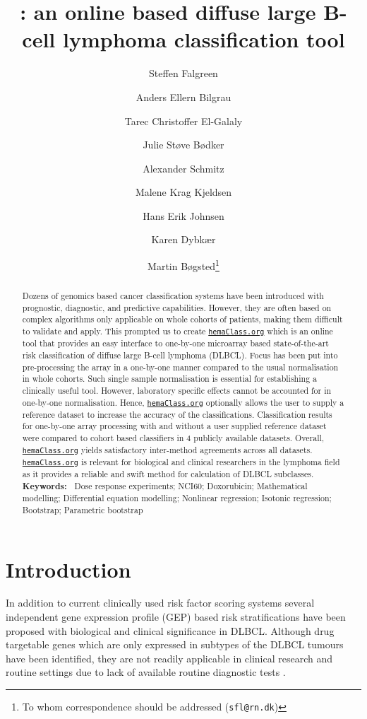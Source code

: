 \documentclass{article}
\title{\hemaClass{}: an online based diffuse large B-cell lymphoma classification tool}
\author[1]{Steffen Falgreen}
\author[12]{Anders Ellern Bilgrau}
\author[1]{Tarec Christoffer El-Galaly}
\author[1]{Julie St{\o}ve  B{\o}dker}
\author[1]{Alexander Schmitz}
\author[1]{Malene Krag Kjeldsen}
\author[1]{Hans Erik Johnsen}
\author[1]{Karen Dybk{\ae}r}
\author[13]{Martin B{\o}gsted\thanks{To whom correspondence should be addressed (\texttt{sfl@rn.dk})}}
\affil[1]{Department of Haematology, Aalborg University Hospital}
\affil[2]{Department of Mathematical Sciences, Aalborg University}
\affil[3]{Department of Clinical Medicine, Aalborg University}
\newcommand{\hemaClass}{\href{http://hemaClass.org}{\texttt{hemaClass.org}}}
\begin{document}
\maketitle
{}
{}
\begin{abstract}
Dozens of genomics based cancer classification systems have been introduced with prognostic, diagnostic, and predictive capabilities.
However, they are often based on complex algorithms only applicable on whole cohorts of patients, making them difficult to validate and apply.
This prompted us to create \hemaClass{} which is an online tool that provides an easy interface to one-by-one microarray based state-of-the-art risk classification of diffuse large B-cell lymphoma (DLBCL).
Focus has been put into pre-processing the array in a one-by-one manner compared to the usual normalisation in whole cohorts.
Such single sample normalisation is essential for establishing a clinically useful tool.
However, laboratory specific effects cannot be accounted for in one-by-one normalisation.
Hence, \hemaClass{} optionally allows the user to supply a reference dataset to increase the accuracy of the classifications.
Classification results for one-by-one array processing with and without a user supplied reference dataset were compared to cohort based classifiers in 4 publicly available datasets.
Overall, \hemaClass{} yields satisfactory inter-method agreements across all datasets.
\hemaClass{} is relevant for biological and clinical researchers in the lymphoma field as it provides a reliable and swift method for calculation of DLBCL subclasses.
\medskip\\
\textbf{Keywords:~}
Dose response experiments; NCI60; Doxorubicin; Mathematical modelling; Differential equation modelling; Nonlinear regression; Isotonic regression; Bootstrap; Parametric bootstrap
\end{abstract}



\section{Introduction}

In addition to current clinically used risk factor scoring systems several independent gene expression profile (GEP) based risk stratifications have been proposed with biological and clinical significance in DLBCL.
Although drug targetable genes which are only expressed in subtypes of the DLBCL tumours have been identified, they are not readily applicable in clinical research and routine settings due to lack of available routine diagnostic tests \citep{Jaffe2009}.
\end{document}

